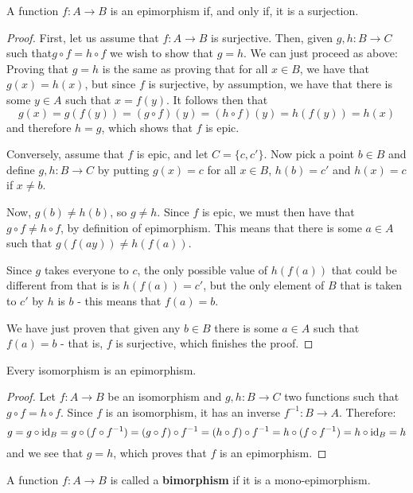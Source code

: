 \begin{theorem}\label{thm: epi is surj}
	A function $f:A\to B$ is an epimorphism if, and only if, it is a surjection.
\end{theorem}
\begin{proof}
	First, let us assume that \(f:A\to B\) is surjective. Then, given \(g,h:B\to C\) such that\(g\circ f= h\circ f\) we wish to show that $g=h$. We can just proceed as above: Proving that $g=h$ is the same as proving that for all $x\in B$, we have that $g(x)=h(x)$, but since $f$ is surjective, by assumption, we have that there is some $y\in A$ such that $x=f(y)$. It follows then that
	\[g(x)=g(f(y))=(g\circ f)(y)=(h\circ f)(y)=h(f(y))=h(x)\]and therefore $h=g$, which shows that $f$ is epic.
	
	 Conversely, assume that $f$ is epic, and let $C=\{c,c'\}$. Now pick a point $b\in B$ and define $g,h:B\to C$ by putting $g(x)=c$ for all $x\in B$, $h(b)=c'$ and $h(x)=c$ if $x\neq b$.
	 
	 Now, $g(b)\neq h(b)$, so $g\neq h$. Since $f$ is epic, we must then have that $g\circ f\neq h\circ f$, by definition of epimorphism. This means that there is some $a\in A$ such that $g(f(ay))\neq h(f(a))$.
	 
	 Since $g$ takes everyone to $c$, the only possible value of $h(f(a))$ that could be different from that is is $h(f(a))=c'$, but the only element of $B$ that is taken to $c'$ by $h$ is $b$ - this means that $f(a)=b$.
	 
	 We have just proven that given any $b\in B$ there is some $a\in A$ such that $f(a)=b$ - that is, $f$ is surjective, which finishes the proof.
\end{proof}

\begin{lemma}\label{lem:iso is epi}
	Every isomorphism is an epimorphism.
\end{lemma}
\begin{proof}
	Let $f:A\to B$ be an isomorphism and $g,h:B\to C$ two functions such that $g\circ f=h\circ f$. Since $f$ is an isomorphism, it has an inverse $f^{-1}:B\to A$. Therefore:
	\[g=g\circ{\rm id}_B=g\circ(f\circ f^{-1})=(g\circ f)\circ f^{-1}=(h\circ f)\circ f^{-1}=h\circ(f\circ f^{-1})=h\circ{\rm id}_B=h\]and we see that $g=h$, which proves that $f$ is an epimorphism.
\end{proof}

\begin{df}
	A function $f:A\to B$ is called a \textbf{bimorphism} if it is a mono-epimorphism.
\end{df}

